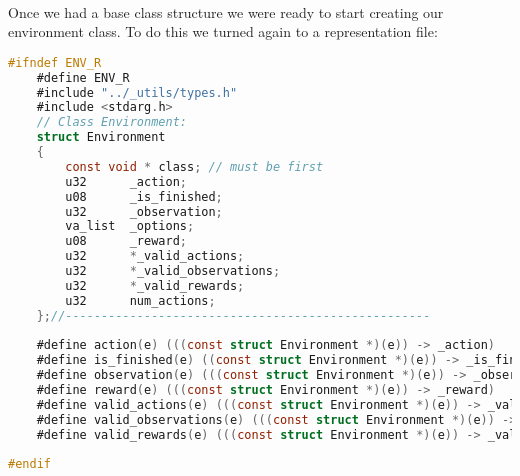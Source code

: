 \documentclass[fancychapters]{report}   	%
\begin{document}
\paragraph{} Once we had a base class structure we were ready to start creating our environment class. To do this we turned again to a representation file:
\begin{lstlisting}[language=C,caption={environment.r}]
#ifndef ENV_R
    #define ENV_R
    #include "../_utils/types.h"
    #include <stdarg.h>
    // Class Environment:
    struct Environment
    {
        const void * class; // must be first
        u32      _action;
        u08      _is_finished;
        u32      _observation;
        va_list  _options;
        u08      _reward;
        u32      *_valid_actions;
        u32      *_valid_observations;
        u32      *_valid_rewards;
        u32      num_actions;
    };//---------------------------------------------------
    
    #define action(e) (((const struct Environment *)(e)) -> _action)
    #define is_finished(e) ((const struct Environment *)(e)) -> _is_finished
    #define observation(e) (((const struct Environment *)(e)) -> _observation)
    #define reward(e) (((const struct Environment *)(e)) -> _reward)
    #define valid_actions(e) (((const struct Environment *)(e)) -> _valid_actions)
    #define valid_observations(e) (((const struct Environment *)(e)) -> _valid_observations)
    #define valid_rewards(e) (((const struct Environment *)(e)) -> _valid_rewards)
    
#endif
\end{lstlisting} 
\end{document}
